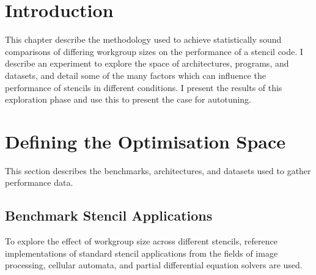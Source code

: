\section{Introduction}

This chapter describe the methodology used to achieve statistically
sound comparisons of differing workgroup sizes on the performance of a
stencil code. I describe an experiment to explore the space of
architectures, programs, and datasets, and detail some of the many
factors which can influence the performance of stencils in different
conditions. I present the results of this exploration phase and use
this to present the case for autotuning.


\section{Defining the Optimisation Space}

This section describes the benchmarks, architectures, and datasets
used to gather performance data.


\subsection{Benchmark Stencil Applications}

To explore the effect of workgroup size across different stencils,
reference implementations of standard stencil applications from the
fields of image processing, cellular automata, and partial
differential equation solvers are used.


